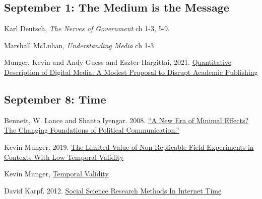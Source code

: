 \vspace{-.1in}\documentclass[11pt]{article}
\begin{document}
\subsection*{September 1: The Medium is the Message}


Karl Deutsch, \textit{The Nerves of Government} ch 1-3, 5-9.

\noindent Marshall McLuhan, \textit{Understanding Media} ch 1-3


\noindent Munger, Kevin and Andy Guess and Eszter Hargittai, 2021. \href{https://journalqd.org/article/view/2713/1825}{Quantitative Description of Digital Media: A Modest Proposal to Disrupt Academic Publishing}


\subsection*{September 8: Time}


\noindent Bennett, W. Lance and Shanto Iyengar. 2008. \href{https://watermark.silverchair.com/jjnlcom0707.pdf?token=AQECAHi208BE49Ooan9kkhW_Ercy7Dm3ZL_9Cf3qfKAc485ysgAAAuMwggLfBgkqhkiG9w0BBwagggLQMIICzAIBADCCAsUGCSqGSIb3DQEHATAeBglghkgBZQMEAS4wEQQMxeWmnFmyhtJ1QIhvAgEQgIIClvh7EVCxMWBMC914ltsWhroj0SSXor8T5zs_WNx5ROp4s7nw6UtLcbtgtw8yXDv5GvqR200PI2XpdGtp9Nz11PuXIktWBU3SawPu_RbYz82G-iGCsafeQT4W8o6TO_nsjaFSF_m4M_ON1ECqmh3-oH6wXkCUrbgBdW26hl08OWeJy_bloCzMpGfYmb9y4j8JI20QcaNlWuB9Wx2uQgfwi06Eo1kyHmnmSVV9H4nXKK4iWmPwy8uSsdMkkUTpc15dtVtGgI_DKiQN66NVzqg-70vY5dSjjOKO61nNJZzjZy_r0TY3D-5xL2TmxEyn_09gHaWFkUf8wIcorY5xTTDd7-K08ee1jeeSQE-xaoCbkHSh_XhZVGT5OBiVy5KDhrDMe6ZMPp_DVqfKohzHNMoMRHlaiMXVLhLkDUXmFA9Xxk0jdKRKdmoaloKpKOsxN3pvU5GGu-NM4MXBkdlZmIvOnFP0vsEMoqH-1Y1YeupnnkAMh2ATKDpz_nFQK_84THWs-YsnzqnUm76PeRjKw_1fqjiZyg0kaHjP2EBHdg3qZjno1sa06y_ZM0FGklD7I5pXxbXFPIO4DjphpWHra-cKUZTImlIKcA-c27J5Yb5VCmFvI7RPcCM1SU-IZQPOkTQqzHcm211jURLtQ6rOj0umWzNh9-Cx065iMxFZJs7urqiDPYIvPeJgbCtm3NDDHQWRxzilqoXmN2kor3m7Bq-pUiDRd-TPyNtAKO4mEB_AYiLb7fJLnJ9VidSAWj9mfqXNX8qfyW0ozReaidr4DOKUX9q-OT-fm3zzwYaQpUqxHOHiLysY_fpGJ0erbJ1QAq7ihVHRuVFajJ1oc1gXj-F4G28qw4v54T1ve3_r4pxxYlSmZPdaMb7y}{``A New Era of Minimal Effects? The Changing Foundations of Political Communication.'' }


\noindent Kevin Munger. 2019. \href{https://journals.sagepub.com/doi/full/10.1177/2056305119859294}{The Limited Value of Non-Replicable Field Experiments in Contexts With Low Temporal Validity}


\noindent Kevin Munger, \href{https://osf.io/ca5wz/}{Temporal Validity}

\noindent David Karpf. 2012. \href{http://sciencepolicy.colorado.edu/students/envs_5720/karpf_2012.pdf}{Social Science Research Methods In Internet Time }
\end{document}
